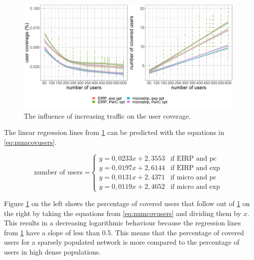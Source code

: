 \begin{figure}[h!]
  \includegraphics[width=\textwidth]{../results/s2/uvsnumdronesAndCov.png}
  \caption{The influence of increasing traffic on the user coverage.}
  \label{fig:s2uvsnumcovusers}
\end{figure}

The linear regression lines from \ref{fig:s2uvsnumcovusers} can be predicted with the equations in \ref{eq:numcovusers}.

\begin{equation}
\text{number of users =}
    \begin{cases}
      y = 0,0233x + 2,3553 & \text{if EIRP and pc}\\
      y = 0,0197x + 2,6144  & \text{if EIRP and exp}\\
      y = 0,0131x + 2,4371  & \text{if micro and pc}\\
      y = 0,0119x + 2,4652  & \text{if micro and exp}
    \end{cases} 
    \label{eq:numcovusers}      
\end{equation}

Figure \ref{fig:s2uvsnumcovusers} on the left shows the percentage of covered users that follow out of \ref{fig:s2uvsnumcovusers} on the right by taking the equations 
from \ref{eq:numcovusers} and dividing them by $x$.
This results in a decreasing logarithmic behaviour because the regression lines from  \ref{fig:s2uvsnumcovusers} have a slope of less than 0.5.
This means that the percentage of covered users for a sparsely populated network is more compared to the percentage of users in high dense populations.

